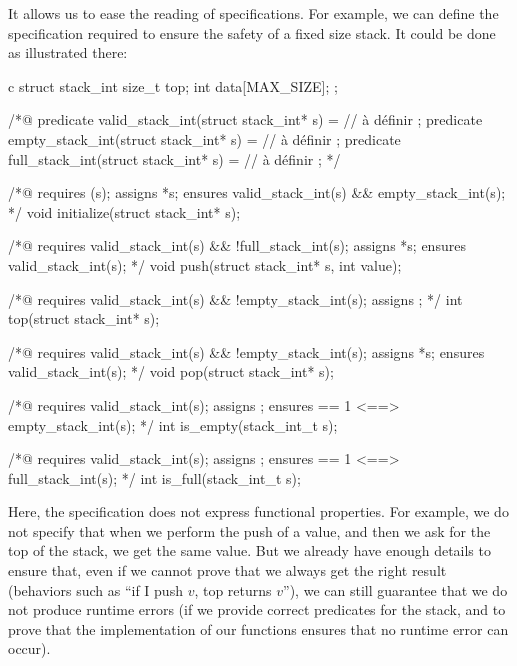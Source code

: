 It allows us to ease the reading of specifications. For example, we can
define the specification required to ensure the safety of a fixed size
stack. It could be done as illustrated there:



\begin{CodeBlock}{c}
struct stack_int{
  size_t top;
  int    data[MAX_SIZE];
};

/*@
  predicate valid_stack_int(struct stack_int* s) = // à définir ;
  predicate empty_stack_int(struct stack_int* s) = // à définir ;
  predicate full_stack_int(struct stack_int* s) =  // à définir ;
*/

/*@
  requires \valid(s);
  assigns *s;
  ensures valid_stack_int(s) && empty_stack_int(s);
*/
void initialize(struct stack_int* s);

/*@
  requires valid_stack_int(s) && !full_stack_int(s);
  assigns  *s;
  ensures valid_stack_int(s);
*/
void push(struct stack_int* s, int value);

/*@
  requires valid_stack_int(s) && !empty_stack_int(s);
  assigns \nothing;
*/
int  top(struct stack_int* s);

/*@
  requires valid_stack_int(s) && !empty_stack_int(s);
  assigns *s;
  ensures valid_stack_int(s);
*/
void pop(struct stack_int* s);

/*@
  requires valid_stack_int(s);
  assigns \nothing;
  ensures \result == 1 <==> empty_stack_int(s);
*/
int  is_empty(stack_int_t s);


/*@
  requires valid_stack_int(s);
  assigns \nothing;
  ensures \result == 1 <==> full_stack_int(s);
*/
int  is_full(stack_int_t s);
\end{CodeBlock}



Here, the specification does not express functional properties. For
example, we do not specify that when we perform the push of a value, and
then we ask for the top of the stack, we get the same value. But we
already have enough details to ensure that, even if we cannot prove that
we always get the right result (behaviors such as ``if I push \(v\), top
returns \(v\)''), we can still guarantee that we do not produce runtime
errors (if we provide correct predicates for the stack, and to prove
that the implementation of our functions ensures that no runtime error
can occur).
